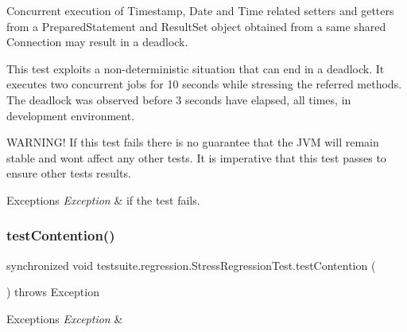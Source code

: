 Concurrent execution of Timestamp, Date and Time related setters and getters from a Prepared\+Statement and Result\+Set object obtained from a same shared Connection may result in a deadlock.

This test exploits a non-\/deterministic situation that can end in a deadlock. It executes two concurrent jobs for 10 seconds while stressing the referred methods. The deadlock was observed before 3 seconds have elapsed, all times, in development environment.

W\+A\+R\+N\+I\+N\+G! If this test fails there is no guarantee that the J\+VM will remain stable and won\textquotesingle{}t affect any other tests. It is imperative that this test passes to ensure other tests results.


\begin{DoxyExceptions}{Exceptions}
{\em Exception} & if the test fails. \\
\hline
\end{DoxyExceptions}
\mbox{\label{classtestsuite_1_1regression_1_1_stress_regression_test_a9e52f4e90a98cc513dfd3318d348c531}} 
\subsubsection{\texorpdfstring{test\+Contention()}{testContention()}}
{\footnotesize\ttfamily synchronized void testsuite.\+regression.\+Stress\+Regression\+Test.\+test\+Contention (\begin{DoxyParamCaption}{ }\end{DoxyParamCaption}) throws Exception}


\begin{DoxyExceptions}{Exceptions}
{\em Exception} & \\
\hline
\end{DoxyExceptions}
\mbox{\label{classtestsuite_1_1regression_1_1_stress_regression_test_a8253fc7fb64e884132640398b2bc5aed}} 

